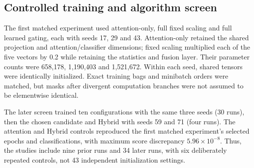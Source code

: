 \subsection{Controlled training and algorithm screen}
The first matched experiment used attention-only, full fixed scaling and full learned gating, each with seeds 17, 29 and 43. Attention-only retained the shared projection and attention/classifier dimensions; fixed scaling multiplied each of the five vectors by 0.2 while retaining the statistics and fusion layer. Their parameter counts were 658,178, 1,190,403 and 1,521,672. Within each seed, shared tensors were identically initialized. Exact training bags and minibatch orders were matched, but masks after divergent computation branches were not assumed to be elementwise identical.

The later screen trained ten configurations with the same three seeds (30 runs), then the chosen candidate and Hybrid with seeds 59 and 71 (four runs). The attention and Hybrid controls reproduced the first matched experiment's selected epochs and classifications, with maximum score discrepancy $5.96\times10^{-8}$. Thus, the studies include nine prior runs and 34 later runs, with six deliberately repeated controls, not 43 independent initialization settings.

